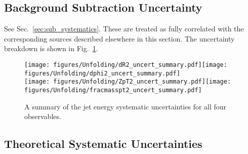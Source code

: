 \subsection{Background Subtraction Uncertainty}
\label{sec:systs:background}

See Sec.~\ref{sec:sub_systematics}. These are treated as fully correlated with the corresponding sources described elsewhere in this section.  The uncertainty breakdown is shown in Fig.~\ref{fig:syst_overview_deltaR2}.
  
  \begin{figure}[htpb!]
\begin{center}
\texttt{[image: figures/Unfolding/dR2\_uncert\_summary.pdf]}\texttt{[image: figures/Unfolding/dphi2\_uncert\_summary.pdf]}\\
\texttt{[image: figures/Unfolding/ZpT2\_uncert\_summary.pdf]}\texttt{[image: figures/Unfolding/fracmasspt2\_uncert\_summary.pdf]}
\caption[]{A summary of the jet energy systematic uncertainties for all four observables. } 
\label{fig:syst_overview_deltaR2}
\end{center}
\end{figure}

\subsection{Theoretical Systematic Uncertainties}
\label{sec:systs:theory}

